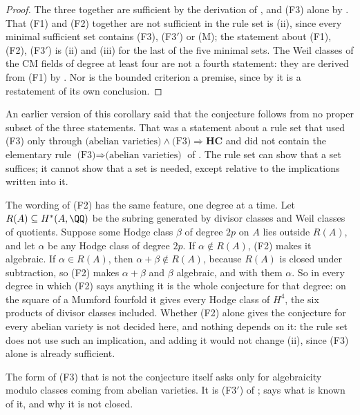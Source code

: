 \begin{proof}
The three together are sufficient by the derivation of ,
and (F3) alone by . That (F1) and (F2) together are not
sufficient in the rule set is (ii), since every minimal
sufficient set contains (F3), \textup{(F3$'$)} or \textup{(M)}; the
statement about (F1), (F2), \textup{(F3$'$)} is (ii) and
(iii) for the last of the five minimal sets. The Weil classes of the CM
fields of degree at least four are not a fourth statement: they are derived
from (F1) by . Nor is the bounded criterion a
premise, since by  it is a restatement of its own
conclusion.
\end{proof}

\begin{remark}
\label{rem:f3collapse}
An earlier version of this corollary said that the conjecture follows from
no proper subset of the three statements. That was a statement about a rule
set that used (F3) only through $\text{(abelian varieties)}\wedge
\text{(F3)}\Rightarrow\mathbf{HC}$ and did not contain the elementary rule
$\text{(F3)}\Rightarrow\text{(abelian varieties)}$ of .
The rule set can show that a set suffices; it cannot show that a set is
needed, except relative to the implications written into it.

The wording of (F2) has the same feature, one degree at a time. Let
$R(A)\subseteq H^{*}(A,\QQ)$ be the subring generated by divisor classes and
Weil classes of quotients. Suppose some Hodge class $\beta$ of degree $2p$ on
$A$ lies outside $R(A)$, and let $\alpha$ be any Hodge class of degree $2p$.
If $\alpha\notin R(A)$, (F2) makes it algebraic. If $\alpha\in R(A)$, then
$\alpha+\beta\notin R(A)$, because $R(A)$ is closed under subtraction, so
(F2) makes $\alpha+\beta$ and $\beta$ algebraic, and with them $\alpha$.
So in every degree in which (F2) says anything it is the whole conjecture for
that degree: on the square of a Mumford fourfold it gives every Hodge class of
$H^{4}$, the six products of divisor classes included. Whether (F2) alone
gives the conjecture for every abelian variety is not decided here, and
nothing depends on it: the rule set does not use such an implication, and
adding it would not change (ii), since (F3) alone is
already sufficient.

The form of (F3) that is not the conjecture itself asks only for
algebraicity modulo classes coming from abelian varieties. It is
\textup{(F3$'$)} of ;  says what is
known of it, and  why it is not closed.
\end{remark}

